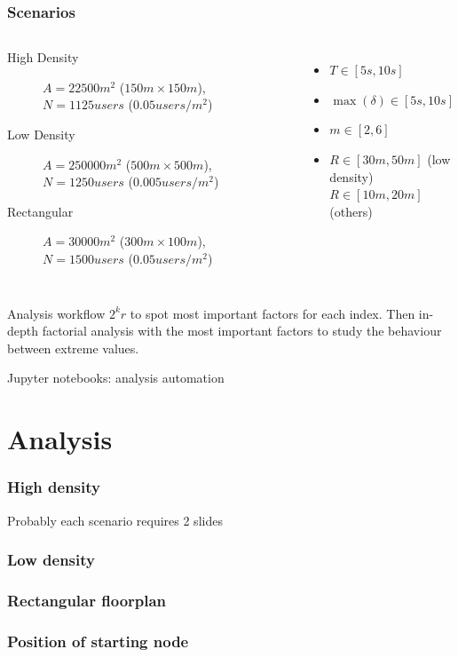 \documentclass{beamer}
\begin{document}
\begin{frame}
	\frametitle{Scenarios}
	\begin{columns}
		\begin{description}
			\item[High Density] \(A = 22500m^2\) (\(150m \times
				150m\)), \(N = 1125\mathit{users}\) (\(0.05
					\mathit{users}/m^2\))
			\item[Low Density] \(A = 250000m^2\) (\(500m \times
				500m\)), \(N = 1250\mathit{users}\) (\(0.005
					\mathit{users}/m^2\))
			\item[Rectangular] \(A = 30000m^2\) (\(300m \times
				100m\)), \(N = 1500\mathit{users}\) (\(0.05
					\mathit{users}/m^2\))
		\end{description}
		\begin{itemize}
			\item \(T \in [5s, 10s]\)
			\item \(\max(\delta) \in [5s, 10s]\)
			\item \(m \in [2, 6]\)
			\item \(R \in [30m, 50m]\) (low density)\\
				\(R \in [10m, 20m]\) (others)
		\end{itemize}
	\end{columns}
	\begin{block}{Analysis workflow}
		\(2^{k}r\) to spot most important factors for each index. Then
		in-depth factorial analysis with the most important factors to
		study the behaviour between extreme values.
	\end{block}
	Jupyter notebooks: analysis automation
\end{frame}

\section{Analysis}

\begin{frame}
	\frametitle{High density}
	Probably each scenario requires 2 slides
\end{frame}

\begin{frame}
	\frametitle{Low density}
\end{frame}

\begin{frame}
	\frametitle{Rectangular floorplan}
\end{frame}

\begin{frame}
	\frametitle{Position of starting node}
\end{frame}
\end{document}
